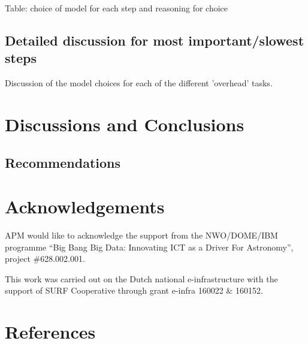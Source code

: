 \documentclass[preprint,5p]{elsarticle}
\begin{document}
Table: choice of model for each step and reasoning for choice

\subsection{Detailed discussion for most important/slowest steps}


Discussion of the model choices for each of the different 'overhead' tasks. 

\section{Discussions and Conclusions}

\subsection{Recommendations}





\section*{Acknowledgements}
APM would like to acknowledge the support from the NWO/DOME/IBM programme ``Big Bang Big Data: Innovating ICT as a Driver For Astronomy'', project \#628.002.001.



This work was carried out on the Dutch national e-infrastructure with the support of SURF
Cooperative through grant e-infra 160022 \& 160152.

\section*{References}

\end{document}
